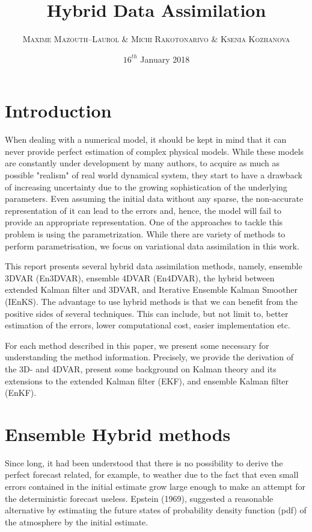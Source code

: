 \documentclass[a4,12pt]{article}
\title{\textbf{Hybrid Data Assimilation}}
\author{
\begin{tabular}{cc}
	\textsc{Maxime Mazouth--Laurol} \& \textsc{Michi Rakotonarivo} \& \textsc{Ksenia Kozhanova}
\end{tabular}}
\date{\small $16^{th}$ January 2018}
\numberwithin{equation}{section}
\begin{document}
\maketitle

\section{Introduction}
When dealing with a numerical model, it should be kept in mind that it can never provide perfect estimation of complex physical models. While these models are constantly under development by many authors, to acquire as much as possible "realism" of real world dynamical system, they start to have a drawback of increasing uncertainty due to the growing sophistication of the underlying parameters. Even assuming the initial data without any sparse, the non-accurate representation of it can lead to the errors and, hence, the model will fail to provide an appropriate representation. One of the approaches to tackle this problem is using the parametrization. While there are variety of methods to perform parametrisation, we focus on variational data assimilation in this work.

This report presents several hybrid data assimilation methods, namely, ensemble 3DVAR (En3DVAR), ensemble 4DVAR (En4DVAR), the hybrid between extended Kalman filter and 3DVAR, and  Iterative Ensemble Kalman Smoother (IEnKS). The advantage to use hybrid methods is that we can benefit from the positive sides of several techniques. This can include, but not limit to, better estimation of the errors, lower computational cost, easier implementation etc. 

For each method described in this paper, we present some necessary for understanding the method information. Precisely, we provide the derivation of the 3D- and 4DVAR, present some background on Kalman theory and its extensions to the extended Kalman filter (EKF), and ensemble Kalman filter (EnKF).

\section{Ensemble Hybrid methods}

Since long, it had been understood that there is no possibility to derive the perfect forecast related, for example, to weather due to the fact that even small errors contained in the initial estimate grow large enough to make an attempt for the deterministic forecast useless. Epstein (1969), suggested a reasonable alternative by estimating the future states of probability density function (pdf)  of the atmosphere by the initial estimate.
\end{document}
